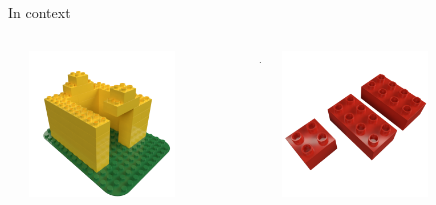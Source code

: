 \begin{frame}{In context}
    \begin{columns}[c]
        \begin{column}{0.05\textwidth}
        \end{column}\begin{column}{0.3\textwidth}
            \centering
            \includegraphics[width=0.7\textwidth]{images/03_transformation_framework/duplo_house_roofless.png}
        \end{column}\begin{column}{0.05\textwidth}
            \centering
            +
        \end{column}\begin{column}{0.2\textwidth}
            \centering
            \includegraphics[width=0.7\textwidth]{images/03_transformation_framework/duplo_roof_pieces.png}
        \end{column}\begin{column}{0.05\textwidth}

\end{column}
\end{columns}
\end{frame}
